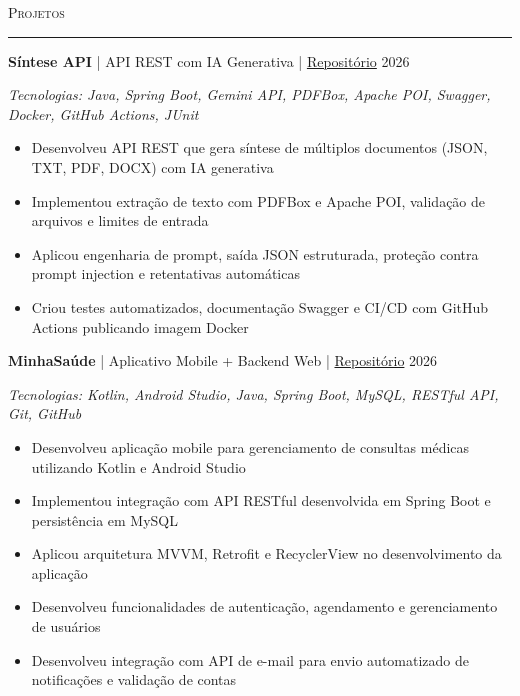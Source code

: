 \documentclass[a4paper]{article}
\newcommand{\header}[1]{ \vspace{4mm} {\large\textsc{#1}} \vspace{1mm} \hrule \vspace{2mm} }
\begin{document}

\header{Projetos}

\textbf{Síntese API} | API REST com IA Generativa | \href{https://github.com/IsaqueCarlos28/SinteseGeneratorApi}{Repositório} \hfill 2026

\textit{Tecnologias: Java, Spring Boot, Gemini API, PDFBox, Apache POI, Swagger, Docker, GitHub Actions, JUnit}

\begin{itemize}[leftmargin=*, nosep]
    \item Desenvolveu API REST que gera síntese de múltiplos documentos (JSON, TXT, PDF, DOCX) com IA generativa
    \item Implementou extração de texto com PDFBox e Apache POI, validação de arquivos e limites de entrada
    \item Aplicou engenharia de prompt, saída JSON estruturada, proteção contra prompt injection e retentativas automáticas
    \item Criou testes automatizados, documentação Swagger e CI/CD com GitHub Actions publicando imagem Docker
\end{itemize}

\vspace{3mm}

\textbf{MinhaSaúde} | Aplicativo Mobile + Backend Web | \href{https://github.com/IsaqueCarlos28/PI_MinhaSaude}{Repositório} \hfill 2026

\textit{Tecnologias: Kotlin, Android Studio, Java, Spring Boot, MySQL, RESTful API, Git, GitHub}

\begin{itemize}[leftmargin=*, nosep]
    \item Desenvolveu aplicação mobile para gerenciamento de consultas médicas utilizando Kotlin e Android Studio
    \item Implementou integração com API RESTful desenvolvida em Spring Boot e persistência em MySQL
    \item Aplicou arquitetura MVVM, Retrofit e RecyclerView no desenvolvimento da aplicação
    \item Desenvolveu funcionalidades de autenticação, agendamento e gerenciamento de usuários
    \item Desenvolveu integração com API de e-mail para envio automatizado de notificações e validação de contas
\end{itemize}

\end{document}
